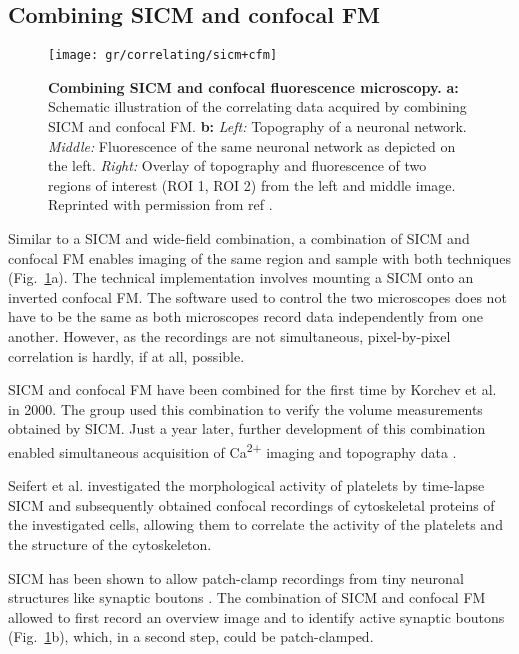 \subsection{Combining SICM and confocal FM}

\begin{figure}
  \texttt{[image: gr/correlating/sicm+cfm]}
  \caption{%
    \textbf{Combining SICM and confocal fluorescence microscopy.}
    \textbf{a:} Schematic illustration of the correlating data acquired by combining SICM and confocal FM.
    \textbf{b:} 
    	\textit{Left:} Topography of a neuronal network.
    	\textit{Middle:} Fluorescence of the same neuronal network as depicted on the left.
    	\textit{Right:} Overlay of topography and fluorescence of two regions of interest (ROI 1, ROI 2) from
    	the left and middle image.
    Reprinted with permission from ref \cite{Novak2013}.
  }
  \label{fig:sicm+cfm}
\end{figure}

Similar to a SICM and wide-field combination, a combination of SICM and
confocal FM enables imaging of the same region and sample with both techniques
(Fig.~\ref{fig:sicm+cfm}a). The technical implementation involves mounting a
SICM onto an inverted confocal FM. The software used to control the two
microscopes does not have to be the same as both microscopes record data
independently from one another. However, as the recordings are not
simultaneous, pixel-by-pixel correlation is hardly, if at all, possible.

SICM and confocal FM have been combined for the first time by Korchev et al.
\cite{Korchev2000} in 2000. The group used this combination to verify the
volume measurements obtained by SICM. Just a year later, further development
of this combination enabled simultaneous acquisition of Ca\textsuperscript{2+}
imaging and topography data \cite{Shevchuk2001}.

Seifert et al. \cite{Seifert2017} investigated the morphological activity of
platelets by time-lapse SICM and subsequently obtained confocal recordings of
cytoskeletal proteins of the investigated cells, allowing them to correlate
the activity of the platelets and the structure of the cytoskeleton. 

SICM has been shown to allow patch-clamp recordings from tiny neuronal
structures like synaptic boutons \cite{Novak2013}. The combination of SICM and
confocal FM allowed to first record an overview image and to identify active
synaptic boutons (Fig.~\ref{fig:sicm+cfm}b), which, in a second step, could be
patch-clamped.


